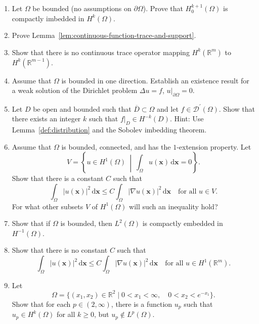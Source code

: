 \begin{enumerate}[label=\thesection.\arabic*.,ref=\thesection.\arabic*,start=1,series=book-problems]
\item\label{ex:zero-boundary-compact-sobolev-embedding-no-regularity} Let $\Omega$ be bounded (no assumptions on $\partial\Omega$). Prove that $H_0^{k+1}(\Omega)$ is compactly imbedded in $H^k(\Omega)$.

\item\label{ex:continuous-function-trace-support-lemma-proof} Prove Lemma~\ref{lem:continuous-function-trace-and-support}.

\item\label{ex:trace-without-half-order-loss-impossible} Show that there is no continuous trace operator mapping $H^k(\mathbb{R}^m)$ to $H^k(\mathbb{R}^{m-1})$.

\item\label{ex:one-direction-bounded-domain-weak-dirichlet-existence} Assume that $\Omega$ is bounded in one direction. Establish an existence result for a weak solution of the Dirichlet problem $\Delta u=f$, $u|_{\partial\Omega}=0$.

\item\label{ex:distribution-local-negative-sobolev-order} Let $D$ be open and bounded such that $\overline D\subset\Omega$ and let $f\in\mathcal{D}^{\prime}(\Omega)$. Show that there exists an integer $k$ such that $f|_D\in H^{-k}(D)$. Hint: Use Lemma~\ref{def:distribution} and the Sobolev imbedding theorem.

\item\label{ex:mean-zero-sobolev-poincare-inequality} Assume that $\Omega$ is bounded, connected, and has the $1$-extension property. Let\[V=\left\{u\in H^1(\Omega)\ \middle|\ \int_{\Omega}u(\bm{x})\,\mathrm{d}\bm{x}=0\right\}.\]Show that there is a constant $C$ such that\[\int_{\Omega}|u(\bm{x})|^2\,\mathrm{d}\bm{x}\leq C\int_{\Omega}|\nabla u(\bm{x})|^2\,\mathrm{d}\bm{x}\quad\text{for all }u\in V.\]For what other subsets $V$ of $H^1(\Omega)$ will such an inequality hold?

\item\label{ex:l-two-into-negative-one-compact-embedding} Show that if $\Omega$ is bounded, then $L^2(\Omega)$ is compactly embedded in $H^{-1}(\Omega)$.

\item\label{ex:whole-space-poincare-no-uniform-constant} Show that there is no constant $C$ such that\[\int_{\Omega}|u(\bm{x})|^2\,\mathrm{d}\bm{x}\leq C\int_{\Omega}|\nabla u(\bm{x})|^2\,\mathrm{d}\bm{x}\quad\text{for all }u\in H^1(\mathbb{R}^m).\]

\item\label{ex:narrow-unbounded-domain-smooth-not-l-p-example} Let\[\Omega=\{(x_1,x_2)\in\mathbb{R}^2\mid0<x_1<\infty,\quad0<x_2<e^{-x_1}\}.\]Show that for each $p\in(2,\infty)$, there is a function $u_p$ such that $u_p\in H^k(\Omega)$ for all $k\geq0$, but $u_p\notin L^p(\Omega)$.


\end{enumerate}
